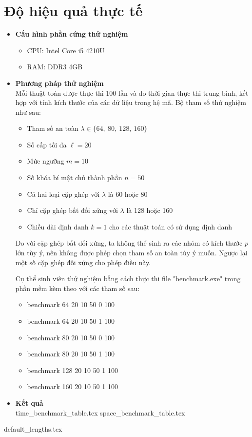 \documentclass[class=report, crop=false]{standalone}
\begin{document}
	\section{Độ hiệu quả thực tế}	
		\begin{itemize}
			\item[] {\sffamily\bfseries Cấu hình phần cứng thử nghiệm}
			\begin{itemize}
				\item CPU: Intel Core i5 4210U
				\item RAM: DDR3 4GB
			\end{itemize}
			\item[] {\sffamily\bfseries Phương pháp thử nghiệm} \\
			Mỗi thuật toán được thực thi 100 lần và đo thời gian thực thi trung bình, kết hợp với tính kích thước của các dữ liệu trong hệ mã. Bộ tham số thử nghiệm như sau:
			\begin{itemize}
				\item Tham số an toàn $\lambda \in \{64,\ 80,\ 128,\ 160 \}$
				\item Số cấp tối đa $\ell = 20$
				\item Mức ngưỡng $m = 10$
				\item Số khóa bí mật chủ thành phần $n = 50$
				\item Cả hai loại cặp ghép với $\lambda$ là 60 hoặc 80
				\item Chỉ cặp ghép bất đối xứng với $\lambda$ là 128 hoặc 160
				\item Chiều dài định danh $k = 1$ cho các thuật toán có sử dụng định danh
			\end{itemize}
			Do với cặp ghép bất đối xứng, ta không thể sinh ra các nhóm có kích thước $p$ lớn tùy ý, nên không được phép chọn tham số an toàn tùy ý muốn. Ngược lại một số cặp ghép đối xứng cho phép điều này.

			Cụ thể sinh viên thử nghiệm bằng cách thực thi file "benchmark.exe" trong phần mềm kèm theo với các tham số sau:
			\begin{itemize}
				\ttfamily
				\item[] benchmark 64 20 10 50 0 100
				\item[] benchmark 64 20 10 50 1 100
				\item[] benchmark 80 20 10 50 0 100
				\item[] benchmark 80 20 10 50 1 100
				\item[] benchmark 128 20 10 50 1 100
				\item[] benchmark 160 20 10 50 1 100
			\end{itemize}
			\newpage
			\item[] {\sffamily\bfseries Kết quả} \\
			{time_benchmark_table.tex}
			\newpage
			{space_benchmark_table.tex}
		\end{itemize}
	\newpage
	{default_lengths.tex}
\end{document}
